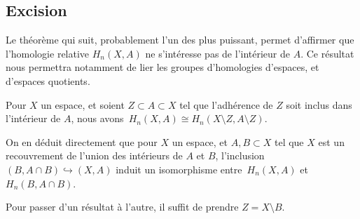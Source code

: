 \subsection{Excision}
Le théorème qui suit, probablement l'un des plus puissant, permet d'affirmer que l'homologie relative $H_n(X,A)$ ne s'intéresse pas de l'intérieur de $A$. Ce résultat nous permettra notamment de lier les groupes d'homologies d'espaces, et d'espaces quotients.

\begin{theorem}
Pour $X$ un espace, et soient $Z\subset A\subset X$ tel que l'adhérence de $Z$ soit inclus dans l'intérieur de $A$, nous avons~${H_n(X,A)\cong H_n(X\setminus Z,A\setminus Z)}$.

On en déduit directement que pour $X$ un espace, et $A,B\subset X$ tel que $X$ est un recouvrement de l'union des intérieurs de $A$ et $B$, l'inclusion $(B,A\cap B)\hookrightarrow(X,A)$ induit un isomorphisme entre~$H_n(X,A)$ et~$H_n(B, A\cap B)$.
\end{theorem}
\begin{remark}
Pour passer d'un résultat à l'autre, il suffit de prendre $Z=X\setminus B$.
\end{remark}
